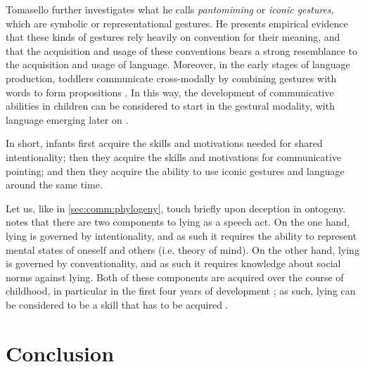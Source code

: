 Tomasello further investigates what he calls \emph{pantomiming} or \emph{iconic gestures}, which are symbolic or representational gestures. 
He presents empirical evidence that these kinds of gestures rely heavily on convention for their meaning, and that the acquisition and usage of these conventions bears a strong resemblance to the acquisition and usage of language.
Moreover, in the early stages of language production, toddlers communicate cross-modally by combining gestures with words to form propositions \citep{Iverson05}.
In this way, the development of communicative abilities in children can be considered to start in the gestural modality, with language emerging later on \citep{Tomasello08}.

In short, infants first acquire the skills and motivations needed for shared intentionality; then they acquire the skills and motivations for communicative pointing; and then they acquire the ability to use iconic gestures and language around the same time.

Let us, like in \cref{sec:comm:phylogeny}, touch briefly upon deception in ontogeny. \citet{Lee13} notes that there are two components to lying as a speech act. On the one hand, lying is governed by intentionality, and as such it requires the ability to represent mental states of oneself and others (i.e. theory of mind). On the other hand, lying is governed by conventionality, and as such it requires knowledge about social norms against lying.
Both of these components are acquired over the course of childhood, in particular in the first four years of development \citep{Lee13}; as such, lying can be considered to be a skill that has to be acquired \citep{Meibauer18}.



\section{Conclusion}
